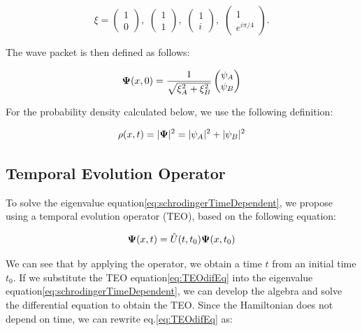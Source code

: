 \begin{equation}
    \label{eq:pseudospinorConfigurations}
    \xi=\begin{pmatrix}
            1\\0
    \end{pmatrix},\,\,\begin{pmatrix}
                          1\\1
    \end{pmatrix},\,\,\begin{pmatrix}
                          1\\i
    \end{pmatrix},\,\,\begin{pmatrix}
                          1\\e^{i\pi/4}
    \end{pmatrix}.
\end{equation}

The wave packet is then defined as follows:

\begin{equation}
    \label{eq:FinalGWP}
    \mbox{\boldmath $\Psi$}(x,0)=\frac{1}{\sqrt {\xi_A^2 + \xi_B^2}}\begin{pmatrix}
                                                          \psi_A\\\psi_B
    \end{pmatrix}
\end{equation}

For the probability density calculated below, we use the following definition:

\begin{equation}
    \label{eq:probDens}
    \rho(x,t)=|\mbox{\boldmath $\Psi$}|^2 = |\psi_A|^2+|\psi_B|^2
\end{equation}

\subsection{Temporal Evolution Operator}\label{subsec:temporal-evolution-operator}
To solve the eigenvalue equation\eqref{eq:schrodingerTimeDependent}, we propose using a temporal evolution operator (TEO), based on the following equation:

\begin{equation}
    \label{eq:TEOdifEq}
    \mbox{\boldmath $\Psi$}(x,t)=\hat{U}(t,t_0)\mbox{\boldmath $\Psi$}(x,t_0)
\end{equation}

\noindent We can see that by applying the operator, we obtain a time $t$ from an initial time $t_0$.
If we substitute the TEO equation\eqref{eq:TEOdifEq} into the eigenvalue equation\eqref{eq:schrodingerTimeDependent}, we can develop the algebra and solve the differential equation to obtain the TEO\@.
Since the Hamiltonian does not depend on time, we can rewrite eq.\eqref{eq:TEOdifEq} as:

